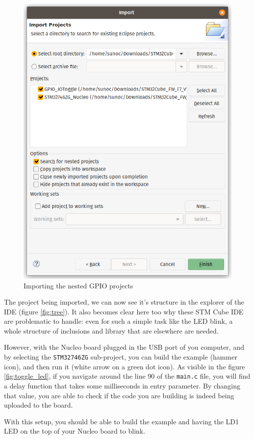 \documentclass[10pt]{article}
\begin{document}
\begin{figure}[H]
  \centering
  \includegraphics[width=.5\textwidth]{./img/project.png}
  \caption{Importing the nested GPIO projects}
  \label{fig:project}
\end{figure}

The project being imported, we can now see it's structure in the explorer of the IDE (figure \ref{fig:tree}). It also becomes clear here too why these STM Cube IDE are problematic to handle: even for such a simple task like the LED blink, a whole structure of inclusions and library that are elsewhere are needed.

However, with the Nucleo board plugged in the USB port of you computer, and by selecting the \verb|STM32746ZG| sub-project, you can build the example (hammer icon), and then run it (white arrow on a green dot icon).
As visible in the figure \ref{fig:toggle_led}, if you navigate around the line 90 of the \verb|main.c| file, you will find a delay function that takes some milliseconds in entry parameter. By changing that value, you are able to check if the code you are building is indeed being uploaded to the board.

With this setup, you should be able to build the example and having the LD1 LED on the top of your Nucleo board to blink.
\end{document}

